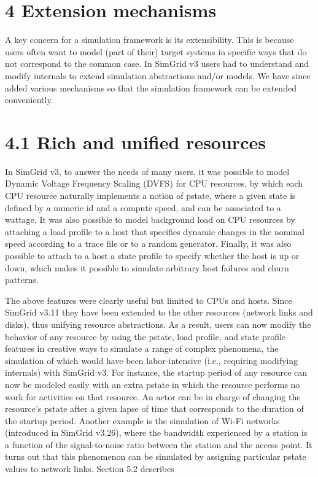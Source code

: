 \documentclass[
]{article}
\begin{document}
\section{4 Extension mechanisms}\label{extension-mechanisms}

A key concern for a simulation framework is its extensibility. This is
because users often want to model (part of their) target systems in
specific ways that do not correspond to the common case. In SimGrid v3
users had to understand and modify internals to extend simulation
abstractions and/or models. We have since added various mechanisms so
that the simulation framework can be extended conveniently.

\section{4.1 Rich and unified
resources}\label{rich-and-unified-resources}

In SimGrid v3, to answer the needs of many users, it was possible to
model Dynamic Voltage Frequency Scaling (DVFS) for CPU resources, by
which each CPU resource naturally implements a notion of pstate, where a
given state is defined by a numeric id and a compute speed, and can be
associated to a wattage. It was also possible to model background load
on CPU resources by attaching a load profile to a host that specifies
dynamic changes in the nominal speed according to a trace file or to a
random generator. Finally, it was also possible to attach to a host a
state profile to specify whether the host is up or down, which makes it
possible to simulate arbitrary host failures and churn patterns.

The above features were clearly useful but limited to CPUs and hosts.
Since SimGrid v3.11 they have been extended to the other resources
(network links and disks), thus unifying resource abstractions. As a
result, users can now modify the behavior of any resource by using the
pstate, load profile, and state profile features in creative ways to
simulate a range of complex phenomena, the simulation of which would
have been labor-intensive (i.e., requiring modifying internals) with
SimGrid v3. For instance, the startup period of any resource can now be
modeled easily with an extra pstate in which the resource performs no
work for activities on that resource. An actor can be in charge of
changing the resource's pstate after a given lapse of time that
corresponds to the duration of the startup period. Another example is
the simulation of Wi-Fi networks (introduced in SimGrid v3.26), where
the bandwidth experienced by a station is a function of the
signal-to-noise ratio between the station and the access point. It turns
out that this phenomenon can be simulated by assigning particular pstate
values to network links. Section 5.2 describes
\end{document}
